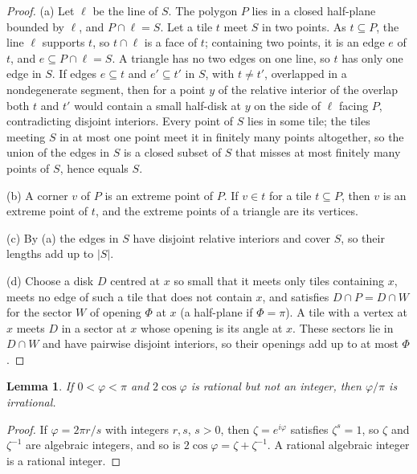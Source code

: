 \documentclass[11pt]{amsart}
\newtheorem{lemma}[theorem]{Lemma}
\theoremstyle{remark}
\begin{document}
\begin{proof}
(a) Let $\ell$ be the line of $S$. The polygon $P$ lies in a closed half-plane bounded by $\ell$, and $P\cap\ell=S$. Let a tile $t$ meet $S$ in two points. As $t\subseteq P$, the line $\ell$ supports $t$, so $t\cap\ell$ is a face of $t$; containing two points, it is an edge $e$ of $t$, and $e\subseteq P\cap\ell=S$. A triangle has no two edges on one line, so $t$ has only one edge in $S$. If edges $e\subseteq t$ and $e'\subseteq t'$ in $S$, with $t\neq t'$, overlapped in a nondegenerate segment, then for a point $y$ of the relative interior of the overlap both $t$ and $t'$ would contain a small half-disk at $y$ on the side of $\ell$ facing $P$, contradicting disjoint interiors. Every point of $S$ lies in some tile; the tiles meeting $S$ in at most one point meet it in finitely many points altogether, so the union of the edges in $S$ is a closed subset of $S$ that misses at most finitely many points of $S$, hence equals $S$.

(b) A corner $v$ of $P$ is an extreme point of $P$. If $v\in t$ for a tile $t\subseteq P$, then $v$ is an extreme point of $t$, and the extreme points of a triangle are its vertices.

(c) By (a) the edges in $S$ have disjoint relative interiors and cover $S$, so their lengths add up to $|S|$.

(d) Choose a disk $D$ centred at $x$ so small that it meets only tiles containing $x$, meets no edge of such a tile that does not contain $x$, and satisfies $D\cap P=D\cap W$ for the sector $W$ of opening $\Phi$ at $x$ (a half-plane if $\Phi=\pi$). A tile with a vertex at $x$ meets $D$ in a sector at $x$ whose opening is its angle at $x$. These sectors lie in $D\cap W$ and have pairwise disjoint interiors, so their openings add up to at most $\Phi$.
\end{proof}

\begin{lemma}\label{lem:irr}
If $0<\varphi<\pi$ and $2\cos\varphi$ is rational but not an integer, then $\varphi/\pi$ is irrational.
\end{lemma}

\begin{proof}
If $\varphi=2\pi r/s$ with integers $r,s$, $s>0$, then $\zeta=e^{i\varphi}$ satisfies $\zeta^s=1$, so $\zeta$ and $\zeta^{-1}$ are algebraic integers, and so is $2\cos\varphi=\zeta+\zeta^{-1}$. A rational algebraic integer is a rational integer.
\end{proof}
\end{document}
